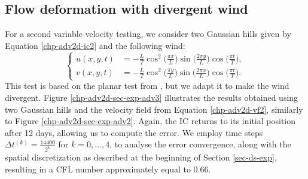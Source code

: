 \subsection{Flow deformation with divergent wind}
For a second variable velocity testing, we consider two Gaussian hills given by Equation 
\eqref{chp-adv2d-ic2} and the following wind:
\begin{equation}
	\label{chp-adv2d-vf2}
	\begin{cases}
		u(x,y,t) &= -\frac{L}{T} \cos^2\big(\frac{\pi x}{L}\big) \sin\big(\frac{2\pi y}{L}\big) \cos\big(\frac{\pi t}{T}\big), \\
		v(x,y,t) &= -\frac{L}{T} \cos^2\big(\frac{\pi y}{L}\big) \sin\big(\frac{2\pi x}{L}\big) \cos\big(\frac{\pi t}{T}\big).
	\end{cases}
\end{equation}
This test is based on the planar test from \citet{nair:2010}, but we adapt it to make the wind divergent.
Figure \ref{chp-adv2d-sec-exp-adv3} illustrates the results obtained using two Gaussian hills and the velocity field 
from Equation \eqref{chp-adv2d-vf2}, similarly to Figure  \ref{chp-adv2d-sec-exp-adv2}.
Again, the IC returns to its initial position after 12 days, allowing us to compute the error.
We employ time steps $\Delta t^{(k)}=\frac{14400}{2^{k}}$ for 
$k = 0, \ldots, 4$, to analyse the error convergence, 
along with the spatial discretization as described at the beginning of Section \ref{sec-ds-exp},
resulting in a CFL number approximately equal to 0.66.
